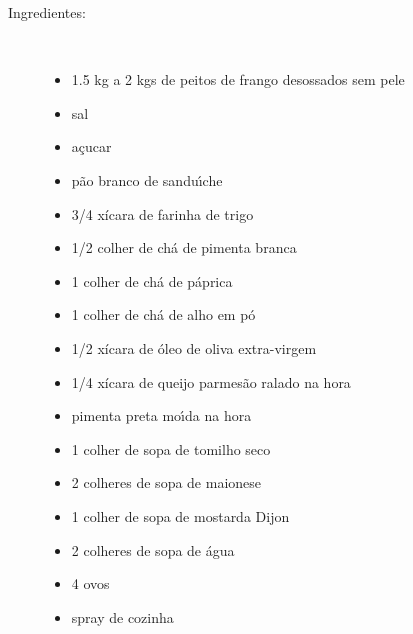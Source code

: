 \documentclass [11pt, papel de carta] {article}
\begin{document}
\begin {description}

\item [Ingredientes:] \ \\
\begin {itemize}
\item 1.5 kg  a 2 kgs de peitos de frango desossados sem pele
\item sal
\item a\c{c}ucar
\item p\~ao branco de sandu\'{\i}che
\item 3/4 xícara de farinha de trigo
\item 1/2 colher de chá de pimenta branca
\item 1 colher de chá de páprica
\item 1 colher de chá de alho em pó
\item 1/2 xícara de \'oleo de oliva extra-virgem
\item 1/4 xícara de queijo parmesão ralado na hora
\item pimenta preta mo\'{\i}da na hora
\item 1 colher de sopa de tomilho seco
\item 2 colheres de sopa de maionese
\item 1 colher de sopa de mostarda Dijon
\item 2 colheres de sopa de água
\item 4 ovos
\item spray de cozinha
\end {itemize}


\end{description}
\end{document}
